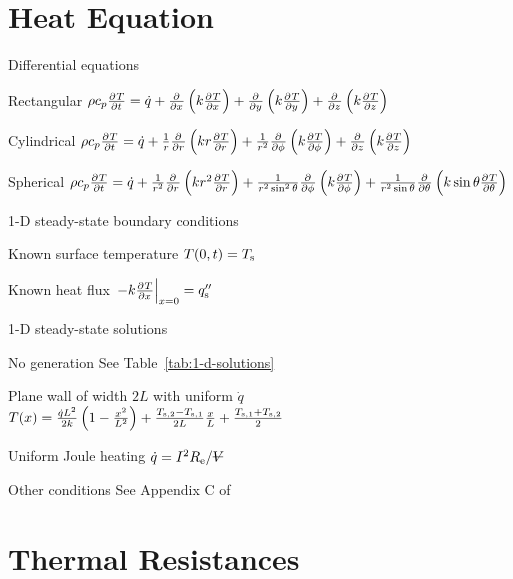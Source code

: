 \documentclass{article}
\begin{document}
\section{Heat Equation}
\begin{description*}
\item[Differential equations]~
  \begin{description*}
  \item[Rectangular]
    \(\rho c_p \pd{T}{t}
    = \dot q
    + \pd{}{x}\left(k\pd{T}{x}\right)
    + \pd{}{y}\left(k\pd{T}{y}\right)
    + \pd{}{z}\left(k\pd{T}{z}\right)\)
  \item[Cylindrical]
    \(\rho c_p \pd{T}{t}
    = \dot q
    + \frac{1}{r}\pd{}{r}\left(kr\pd{T}{r}\right)
    + \frac{1}{r^2}\pd{}{\phi}\left(k\pd{T}{\phi}\right)
    + \pd{}{z}\left(k\pd{T}{z}\right)\)
  \item[Spherical]
    \(\rho c_p \pd{T}{t}
    = \dot q
    + \frac{1}{r^2}\pd{}{r}\left(kr^2\pd{T}{r}\right)
    + \frac{1}{r^2\sin^2\theta}\pd{}{\phi}\left(k\pd{T}{\phi}\right)
    + \frac{1}{r^2\sin\theta}\pd{}{\theta}\left(k\sin\theta\pd{T}{\theta}\right)\)
  \end{description*}
\item[1-D steady-state boundary conditions]~
  \begin{description*}
  \item[Known surface temperature]
    \(T(0,t) = T_{\mathrm{s}}\)
  \item[Known heat flux]
    \(\left.-k\pd{T}{x}\right|_{x=0} = q''_\mrm{s}\)
  \end{description*}
\item[1-D steady-state solutions]~
  \begin{description*}
  \item[No generation] See Table~\ref{tab:1-d-solutions}
  \item[Plane wall of width $2L$ with uniform $\dot q$]
    \(T(x)
    = \frac{\dot{q}L^2}{2k}\left(1-\frac{x^2}{L^2}\right)
    + \frac{T_{\mathrm{s,2}}-T_{\mathrm{s,1}}}{2L}\frac{x}{L}
    + \frac{T_{\mathrm{s,1}}+T_{\mathrm{s,2}}}{2}\)
  \item[Uniform Joule heating]
    \(\dot q = I^2R_\mrm{e}/\volsym\)
  \item[Other conditions] See Appendix C of~\cite{hamt}
  \end{description*}
\end{description*}

\section{Thermal Resistances}
\end{document}
